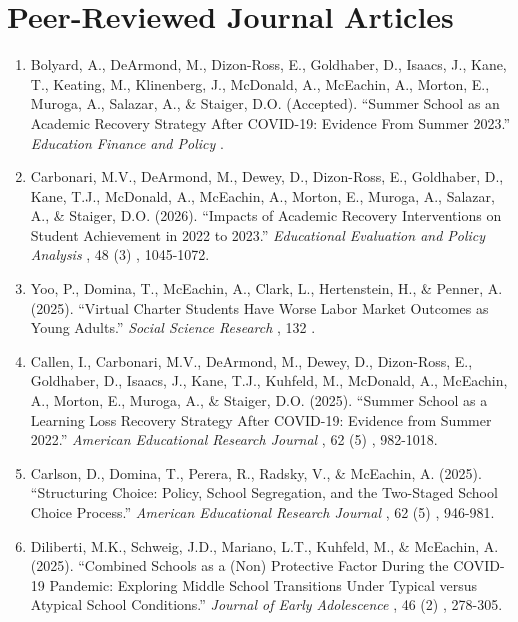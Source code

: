\documentclass[11pt, letterpaper]{article}
\begin{document}
\section{Peer-Reviewed Journal Articles}
\begin{enumerate}[leftmargin=2em]
  \item Bolyard, A., DeArmond, M., Dizon-Ross, E., Goldhaber, D., Isaacs, J., Kane, T., Keating, M., Klinenberg, J., McDonald, A., McEachin, A., Morton, E., Muroga, A., Salazar, A., \& Staiger, D.O. (Accepted).
  ``Summer School as an Academic Recovery Strategy After COVID-19: Evidence From Summer 2023.''
  \textit{Education Finance and Policy}%
%
%
.

  \item Carbonari, M.V., DeArmond, M., Dewey, D., Dizon-Ross, E., Goldhaber, D., Kane, T.J., McDonald, A., McEachin, A., Morton, E., Muroga, A., Salazar, A., \& Staiger, D.O. (2026).
  ``Impacts of Academic Recovery Interventions on Student Achievement in 2022 to 2023.''
  \textit{Educational Evaluation and Policy Analysis}%
, 48%
(3)%
, 1045-1072.

  \item Yoo, P., Domina, T., McEachin, A., Clark, L., Hertenstein, H., \& Penner, A. (2025).
  ``Virtual Charter Students Have Worse Labor Market Outcomes as Young Adults.''
  \textit{Social Science Research}%
, 132%
%
.

  \item Callen, I., Carbonari, M.V., DeArmond, M., Dewey, D., Dizon-Ross, E., Goldhaber, D., Isaacs, J., Kane, T.J., Kuhfeld, M., McDonald, A., McEachin, A., Morton, E., Muroga, A., \& Staiger, D.O. (2025).
  ``Summer School as a Learning Loss Recovery Strategy After COVID-19: Evidence from Summer 2022.''
  \textit{American Educational Research Journal}%
, 62%
(5)%
, 982-1018.

  \item Carlson, D., Domina, T., Perera, R., Radsky, V., \& McEachin, A. (2025).
  ``Structuring Choice: Policy, School Segregation, and the Two-Staged School Choice Process.''
  \textit{American Educational Research Journal}%
, 62%
(5)%
, 946-981.

  \item Diliberti, M.K., Schweig, J.D., Mariano, L.T., Kuhfeld, M., \& McEachin, A. (2025).
  ``Combined Schools as a (Non) Protective Factor During the COVID-19 Pandemic: Exploring Middle School Transitions Under Typical versus Atypical School Conditions.''
  \textit{Journal of Early Adolescence}%
, 46%
(2)%
, 278-305.


\end{enumerate}
\end{document}

